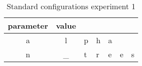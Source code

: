 \begin{table}[h]
\centering
\begin{tabular}{| c|c|}
\hline
parameter & value\\
\hline
a & l & p & h & a\\\hline
n & _ & t & r & e & e & s\\\hline

\end{tabular}\caption{Standard configurations experiment 1} 
\label{tab:./Table/config_test}
\end{table}
